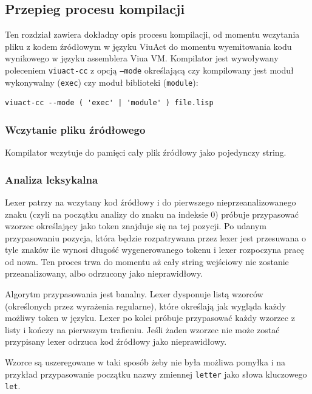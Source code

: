\documentclass[11pt,oneside,a4paper,titlepage,onecolumn]{article}
\begin{document}
\subsection{Przepieg procesu kompilacji}
\label{opis_etapow_kompilacji}

Ten rozdział zawiera dokładny opis procesu kompilacji, od momentu wczytania pliku z kodem źródłowym w języku
ViuAct do momentu wyemitowania kodu wynikowego w języku assemblera Viua VM. Kompilator jest wywoływany
poleceniem \texttt{viuact-cc} z opcją \texttt{--mode} określającą czy kompilowany jest moduł wykonywalny
(\texttt{exec}) czy moduł biblioteki (\texttt{module}):

\begin{lstlisting}
viuact-cc --mode ( 'exec' | 'module' ) file.lisp
\end{lstlisting}

\subsubsection{Wczytanie pliku źródłowego}

Kompilator wczytuje do pamięci cały plik źródłowy jako pojedynczy string.

\subsubsection{Analiza leksykalna}

Lexer patrzy na wczytany kod źródłowy i do pierwszego nieprzeanalizowanego znaku (czyli na początku analizy do
znaku na indeksie 0) próbuje przypasować wzorzec określający jako token znajduje się na tej pozycji. Po udanym
przypasowaniu pozycja, która będzie rozpatrywana przez lexer jest przesuwana o tyle znaków ile wynosi długość
wygenerowanego tokenu i lexer rozpoczyna pracę od nowa. Ten proces trwa do momentu aż cały string wejściowy
nie zostanie przeanalizowany, albo odrzucony jako nieprawidłowy.

Algorytm przypasowania jest banalny. Lexer dysponuje listą wzorców (określonych przez wyrażenia regularne),
które określają jak wygląda każdy możliwy token w języku. Lexer po kolei próbuje przypasować każdy wzorzec z
listy i kończy na pierwszym trafieniu. Jeśli żaden wzorzec nie może zostać przypisany lexer odrzuca kod
źródłowy jako nieprawidłowy.

Wzorce są uszeregowane w taki sposób żeby nie była możliwa pomyłka i
na przykład przypasowanie początku nazwy zmiennej \texttt{letter} jako słowa kluczowego \texttt{let}.
\end{document}
